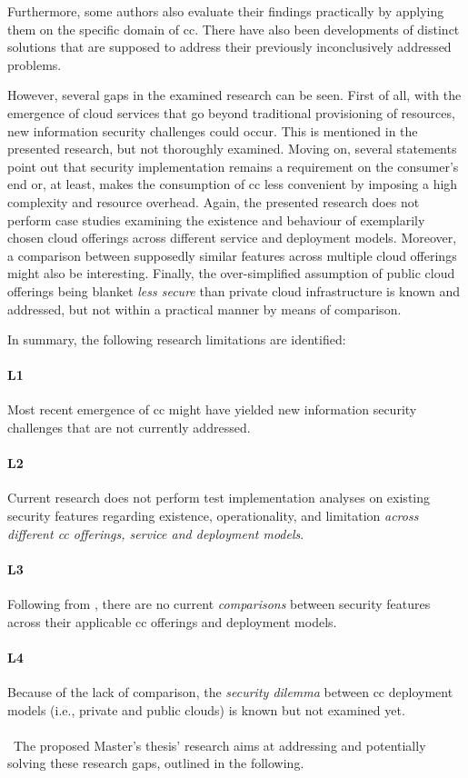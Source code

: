Furthermore, some authors also evaluate their findings practically by applying them on the specific domain of \ac{cc}. There have also been developments of distinct solutions that are supposed to address their previously inconclusively addressed problems. 

However, several gaps in the examined research can be seen. First of all, with the emergence of cloud services that go beyond traditional provisioning of resources, new information security challenges could occur. This is mentioned in the presented research, but not thoroughly examined. Moving on, several statements point out that security implementation remains a requirement on the consumer's end or, at least, makes the consumption of \ac{cc} less convenient by imposing a high complexity and resource overhead. Again, the presented research does not perform case studies examining the existence and behaviour of exemplarily chosen cloud offerings across different service and deployment models. Moreover, a comparison between supposedly similar features across multiple cloud offerings might also be interesting. Finally, the over-simplified assumption of public cloud offerings being blanket \textit{less secure} than private cloud infrastructure is known and addressed, but not within a practical manner by means of comparison.

In summary, the following research limitations are identified:

\paragraph{L1}\label{l1} Most recent emergence of \ac{cc} might have yielded new information security challenges that are not currently addressed.
\paragraph{L2}\label{l2} Current research does not perform test implementation analyses on existing security features regarding existence, operationality, and limitation \textit{across different \ac{cc} offerings, service and deployment models}.
\paragraph{L3}\label{l3} Following from , there are no current \textit{comparisons} between security features across their applicable \ac{cc} offerings and deployment models.
\paragraph{L4}\label{l4} Because of the lack of comparison, the \textit{security dilemma} between \ac{cc} deployment models (i.e., private and public clouds) is known but not examined yet.
\\\ \\\
The proposed Master's thesis' research aims at addressing and potentially solving these research gaps, outlined in the following.

